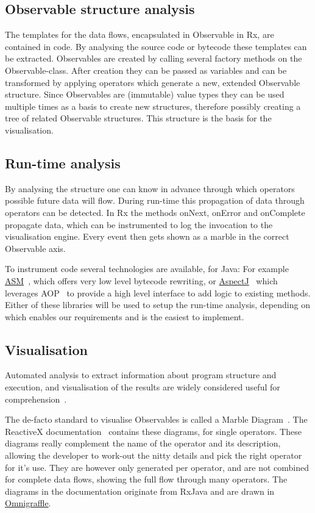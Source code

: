 \subsection{Observable structure analysis}%
The templates for the data flows, encapsulated in Observable in Rx, are
contained in code.  By analysing the source code or bytecode these
templates can be extracted.  Observables are created by calling several
factory methods on the Observable-class.  After creation they can be
passed as variables and can be transformed by applying operators which
generate a new, extended Observable structure.  Since Observables are (immutable)
value types they can be used multiple times as a basis to create new
structures, therefore possibly creating a tree of related Observable
structures.  This structure is the basis for the visualisation.

\subsection{Run-time analysis} By analysing the structure one can know
in advance through which operators possible future data will flow.
During run-time this propagation of data through operators can be
detected.  In Rx the methods onNext, onError and onComplete propagate
data, which can be instrumented to log the invocation to the
visualisation engine.  Every event then gets shown as a marble in the
correct Observable axis.

To instrument code several technologies are available, for Java:  For
example \href{http://asm.ow2.org}{ASM}~\cite{bruneton2002asm,
kuleshov2007using}, which offers very low level bytecode rewriting, or
\href{http://www.eclipse.org/aspectj/}{AspectJ}~\cite{kiczales2001overview}
which leverages AOP~\cite{kiczales1997aspect} to provide a high level
interface to add logic to existing methods.  Either of these libraries
will be used to setup the run-time analysis, depending on which enables
our requirements and is the easiest to implement.

\subsection{Visualisation}%
Automated analysis to extract information about program structure and
execution, and visualisation of the results are widely considered useful
for comprehension~\cite{weck2016visualizing,quante2008dynamic}.

The de-facto standard to visualise Observables is called a Marble
Diagram~\cite{c9_marblediagrams}.  The ReactiveX documentation~\cite{reactivex}
contains these diagrams, for single operators.  These diagrams really
complement the name of the operator and its description, allowing the
developer to work-out the nitty details and pick the right operator for
it's use.  They are however only generated per operator, and are not
combined for complete data flows, showing the full flow through many
operators.  The diagrams in the documentation originate from RxJava and
are drawn in \href{https://www.omnigroup.com/omnigraffle} {Omnigraffle}.

